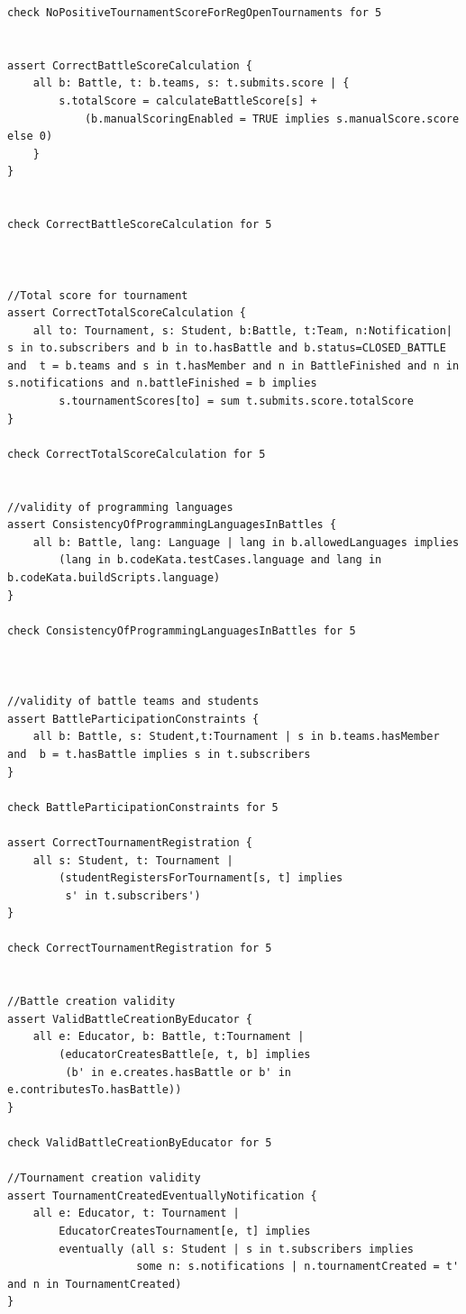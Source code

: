 \begin{lstlisting}[language=alloy]
check NoPositiveTournamentScoreForRegOpenTournaments for 5


assert CorrectBattleScoreCalculation {
    all b: Battle, t: b.teams, s: t.submits.score | {
        s.totalScore = calculateBattleScore[s] +
            (b.manualScoringEnabled = TRUE implies s.manualScore.score else 0)
    }
}


check CorrectBattleScoreCalculation for 5



//Total score for tournament 
assert CorrectTotalScoreCalculation {
    all to: Tournament, s: Student, b:Battle, t:Team, n:Notification| s in to.subscribers and b in to.hasBattle and b.status=CLOSED_BATTLE  and  t = b.teams and s in t.hasMember and n in BattleFinished and n in s.notifications and n.battleFinished = b implies
        s.tournamentScores[to] = sum t.submits.score.totalScore
}

check CorrectTotalScoreCalculation for 5


//validity of programming languages
assert ConsistencyOfProgrammingLanguagesInBattles {
    all b: Battle, lang: Language | lang in b.allowedLanguages implies
        (lang in b.codeKata.testCases.language and lang in b.codeKata.buildScripts.language)
}

check ConsistencyOfProgrammingLanguagesInBattles for 5



//validity of battle teams and students
assert BattleParticipationConstraints {
    all b: Battle, s: Student,t:Tournament | s in b.teams.hasMember and  b = t.hasBattle implies s in t.subscribers
}

check BattleParticipationConstraints for 5
 
assert CorrectTournamentRegistration {
    all s: Student, t: Tournament | 
        (studentRegistersForTournament[s, t] implies 
         s' in t.subscribers')
}

check CorrectTournamentRegistration for 5


//Battle creation validity 
assert ValidBattleCreationByEducator {
    all e: Educator, b: Battle, t:Tournament | 
        (educatorCreatesBattle[e, t, b] implies 
         (b' in e.creates.hasBattle or b' in e.contributesTo.hasBattle))
}

check ValidBattleCreationByEducator for 5 

//Tournament creation validity
assert TournamentCreatedEventuallyNotification {
    all e: Educator, t: Tournament | 
        EducatorCreatesTournament[e, t] implies 
        eventually (all s: Student | s in t.subscribers implies 
                    some n: s.notifications | n.tournamentCreated = t' and n in TournamentCreated)
}


\end{lstlisting}
